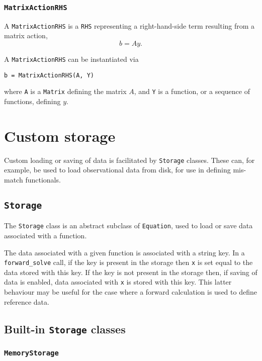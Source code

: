 \documentclass[11pt]{article}
\begin{document}
\subsubsection{\texttt{MatrixActionRHS}}

A \texttt{MatrixActionRHS} is a \texttt{RHS} representing a right-hand-side
term resulting from a matrix action,
\begin{equation*}
  b = A y.
\end{equation*}

A \texttt{MatrixActionRHS} can be instantiated via
\begin{lstlisting}
b = MatrixActionRHS(A, Y)
\end{lstlisting}
where \texttt{A} is a \texttt{Matrix} defining the matrix $A$, and \texttt{Y}
is a function, or a sequence of functions, defining $y$.

\section{Custom storage}

Custom loading or saving of data is facilitated by \texttt{Storage} classes.
These can, for example, be used to load observational data from disk, for use
in defining mis-match functionals.

\subsection{\texttt{Storage}}

The \texttt{Storage} class is an abstract subclass of \texttt{Equation}, used
to load or save data associated with a function.

The data associated with a given function is associated with a string key. In
a \texttt{forward\_solve} call, if the key is present in the storage then
\texttt{x} is set equal to the data stored with this key. If the key is not
present in the storage then, if saving of data is enabled, data associated with
\texttt{x} is stored with this key. This latter behaviour may be useful for the
case where a forward calculation is used to define reference data.

\subsection{Built-in \texttt{Storage} classes}

\subsubsection{\texttt{MemoryStorage}}
\end{document}
